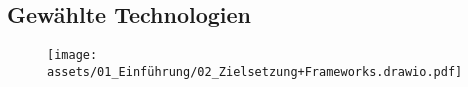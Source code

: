\subsection{Gewählte Technologien}

\begin{figure}[H]
    \centering
    \texttt{[image: assets/01\_Einführung/02\_Zielsetzung+Frameworks.drawio.pdf]}
\end{figure}


\clearpage
